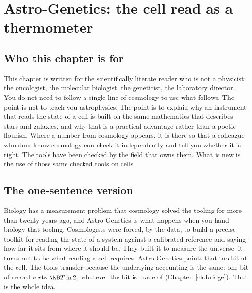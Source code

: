 \chapter{Astro-Genetics: the cell read as a thermometer}\label{ch:astrogenetics}

\section{Who this chapter is for}\label{sec:ag_who}

This chapter is written for the scientifically literate reader who is not a physicist: the oncologist, the molecular biologist, the
geneticist, the laboratory director. You do not need to follow a single line of cosmology to use what follows. The point is not to teach
you astrophysics. The point is to explain why an instrument that reads the state of a cell is built on the same mathematics that
describes stars and galaxies, and why that is a practical advantage rather than a poetic flourish. Where a number from cosmology appears, it
is there so that a colleague who does know cosmology can check it independently and tell you whether it is right. The tools have been
checked by the field that owns them. What is new is the use of those same checked tools on cells.

\section{The one-sentence version}\label{sec:ag_one}

Biology has a measurement problem that cosmology solved the tooling for more than twenty years ago, and Astro-Genetics is what happens
when you hand biology that tooling. Cosmologists were forced, by the data, to build a precise toolkit for reading the state of a system
against a calibrated reference and saying how far it sits from where it should be. They built it to measure the universe; it turns out to
be what reading a cell requires. Astro-Genetics points that toolkit at the cell. The tools transfer because the underlying accounting is
the same: one bit of record costs $\kB T\ln2$, whatever the bit is made of (Chapter~\ref{ch:bridge}). \derived{} That is the whole idea.
\interp

